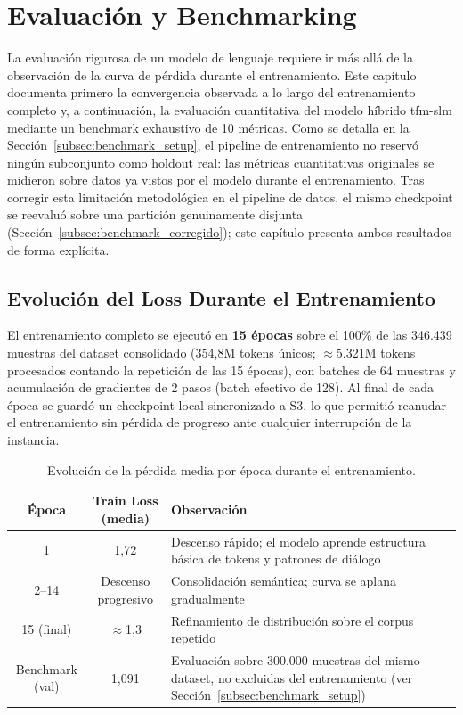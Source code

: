 \section{Evaluación y Benchmarking}
\label{sec:evaluacion}

La evaluación rigurosa de un modelo de lenguaje requiere ir más allá de la observación de la curva de pérdida durante el entrenamiento. Este capítulo documenta primero la convergencia observada a lo largo del entrenamiento completo y, a continuación, la evaluación cuantitativa del modelo híbrido tfm-slm mediante un benchmark exhaustivo de 10 métricas. Como se detalla en la Sección~\ref{subsec:benchmark_setup}, el pipeline de entrenamiento no reservó ningún subconjunto como holdout real: las métricas cuantitativas originales se midieron sobre datos ya vistos por el modelo durante el entrenamiento. Tras corregir esta limitación metodológica en el pipeline de datos, el mismo checkpoint se reevaluó sobre una partición genuinamente disjunta (Sección~\ref{subsec:benchmark_corregido}); este capítulo presenta ambos resultados de forma explícita.

\subsection{Evolución del Loss Durante el Entrenamiento}
\label{subsec:training_convergence}

El entrenamiento completo se ejecutó en \textbf{15 épocas} sobre el 100\% de las 346.439 muestras del dataset consolidado (354,8M tokens únicos; $\approx$5.321M tokens procesados contando la repetición de las 15 épocas), con batches de 64 muestras y acumulación de gradientes de 2 pasos (batch efectivo de 128). Al final de cada época se guardó un checkpoint local sincronizado a S3, lo que permitió reanudar el entrenamiento sin pérdida de progreso ante cualquier interrupción de la instancia.

\begin{table}[H]
\centering
\begin{tabularx}{\textwidth}{|c|c|X|}
\hline
\textbf{Época} & \textbf{Train Loss (media)} & \textbf{Observación} \\ \hline
1 & 1,72 & Descenso rápido; el modelo aprende estructura básica de tokens y patrones de diálogo \\ \hline
2--14 & Descenso progresivo & Consolidación semántica; curva se aplana gradualmente \\ \hline
15 (final) & $\approx$1,3 & Refinamiento de distribución sobre el corpus repetido \\ \hline
Benchmark (val) & 1,091 & Evaluación sobre 300.000 muestras del mismo dataset, no excluidas del entrenamiento (ver Sección~\ref{subsec:benchmark_setup}) \\ \hline
\end{tabularx}
\caption{Evolución de la pérdida media por época durante el entrenamiento.}
\label{tab:training_loss}
\end{table}

